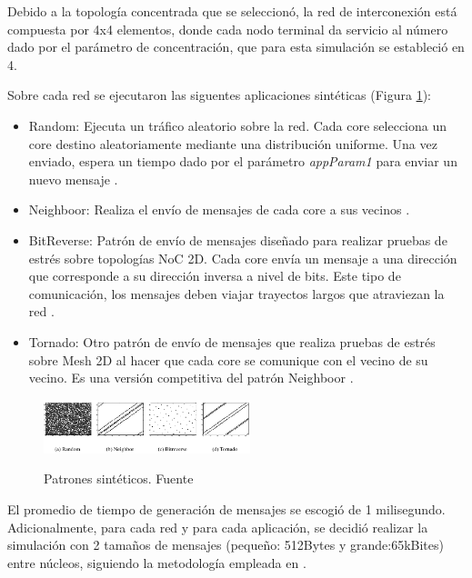 \documentclass{IEEEtran}
\begin{document}
Debido a la topología concentrada que se seleccionó, la red de interconexión 
está compuesta por 4x4 elementos, donde cada nodo terminal da servicio al 
número dado por el parámetro de concentración, que para esta simulación se estableció
en 4.

Sobre cada red se ejecutaron las siguentes aplicaciones sintéticas 
(Figura \ref{fig:synthbench}):
\begin{itemize}
\item Random: 
Ejecuta un tráfico aleatorio sobre la red. Cada core selecciona un core destino aleatoriamente
mediante una distribución uniforme. Una vez enviado, espera un tiempo dado por el parámetro
\textit{appParam1} para enviar un nuevo mensaje \cite{Manual}.

\item Neighboor: 
Realiza el envío de mensajes de cada core a sus vecinos \cite{hendry2009analysis}.

\item BitReverse: 
Patrón de envío de mensajes diseñado para realizar pruebas de estrés sobre topologías NoC 2D.
Cada core envía un mensaje a una dirección que corresponde a su dirección inversa a nivel de
bits. Este tipo de comunicación, los mensajes deben viajar trayectos largos que atraviezan la 
red \cite{hendry2009analysis}.

\item Tornado: 
Otro patrón de envío de mensajes que realiza pruebas de estrés sobre Mesh 2D al hacer que
cada core se comunique con el vecino de su vecino. Es una versión competitiva del patrón
Neighboor \cite{hendry2009analysis}.
\end{itemize}
 
\begin{figure}[H]
\caption{Patrones sintéticos. Fuente \cite{hendry2009analysis}}
\centering
\includegraphics[width=6cm,natwidth=787,natheight=205]{figs/syntbench.png}
\label{fig:synthbench}
\end{figure} 


El promedio de tiempo de generación de mensajes se escogió de 1 milisegundo. 
Adicionalmente,
para cada red y para cada aplicación, se decidió realizar la simulación
con 2 tamaños de mensajes (pequeño: 512Bytes y grande:65kBites) entre núcleos,
siguiendo la metodología empleada en \cite{hendry2009analysis}.
\end{document}
